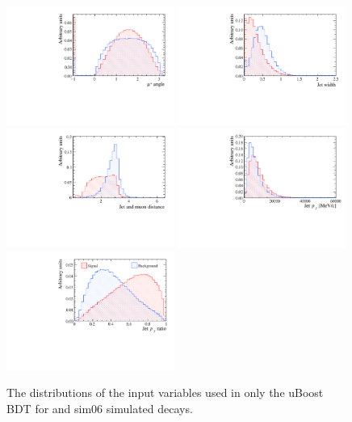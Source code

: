 \begin{figure}[htbp]
  \centering
    \includegraphics[width=0.49\textwidth]{./Figs/Appendix2/muon_angle.pdf}
    \includegraphics[width=0.49\textwidth]{./Figs/Appendix2/jet_width.pdf}
    \includegraphics[width=0.49\textwidth]{./Figs/Appendix2/jet_daugt_dist.pdf}
    \includegraphics[width=0.49\textwidth]{./Figs/Appendix2/jet_pt.pdf}
    \includegraphics[width=0.49\textwidth]{./Figs/Appendix2/jet_pt_ratio.pdf}
 
  \caption{The distributions of the input variables used in only the uBoost BDT for \bsmumu and  sim06 simulated decays.}
  \label{fig:myBDTvars}
\end{figure}




